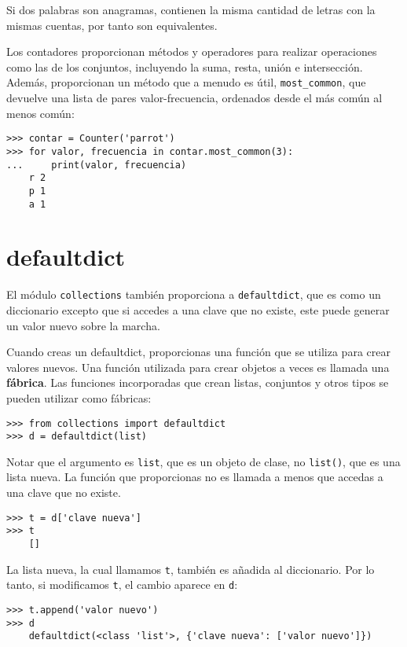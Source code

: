 \documentclass[10pt]{book}
\begin{document}
Si dos palabras son anagramas, contienen la misma cantidad de letras con la mismas
cuentas, por tanto son equivalentes.

Los contadores proporcionan métodos y operadores para realizar operaciones como las de los conjuntos,
incluyendo la suma, resta, unión e intersección.  Además,
proporcionan un método que a menudo es útil, \verb"most_common", que
devuelve una lista de pares valor-frecuencia, ordenados desde el más común al
menos común:

\begin{verbatim}
>>> contar = Counter('parrot')
>>> for valor, frecuencia in contar.most_common(3):
...     print(valor, frecuencia)
    r 2
    p 1
    a 1
\end{verbatim}


\section{defaultdict}

El módulo {\tt collections} también proporciona a {\tt defaultdict}, que es
como un diccionario excepto que si accedes a una clave que no existe,
este puede generar un valor nuevo sobre la marcha.

Cuando creas un defaultdict, proporcionas una función que se utiliza para
crear valores nuevos.  Una función utilizada para crear objetos a veces es
llamada una {\bf fábrica}.  Las funciones incorporadas que crean listas, conjuntos
y otros tipos se pueden utilizar como fábricas:

\begin{verbatim}
>>> from collections import defaultdict
>>> d = defaultdict(list)
\end{verbatim}

Notar que el argumento es {\tt list}, que es un objeto de clase,
no {\tt list()}, que es una lista nueva.  La función que proporcionas
no es llamada a menos que accedas a una clave que no existe.

\begin{verbatim}
>>> t = d['clave nueva']
>>> t
    []
\end{verbatim}

La lista nueva, la cual llamamos {\tt t}, también es añadida al
diccionario.  Por lo tanto, si modificamos {\tt t}, el cambio aparece en {\tt d}:

\begin{verbatim}
>>> t.append('valor nuevo')
>>> d
    defaultdict(<class 'list'>, {'clave nueva': ['valor nuevo']})
\end{verbatim}
\end{document}

